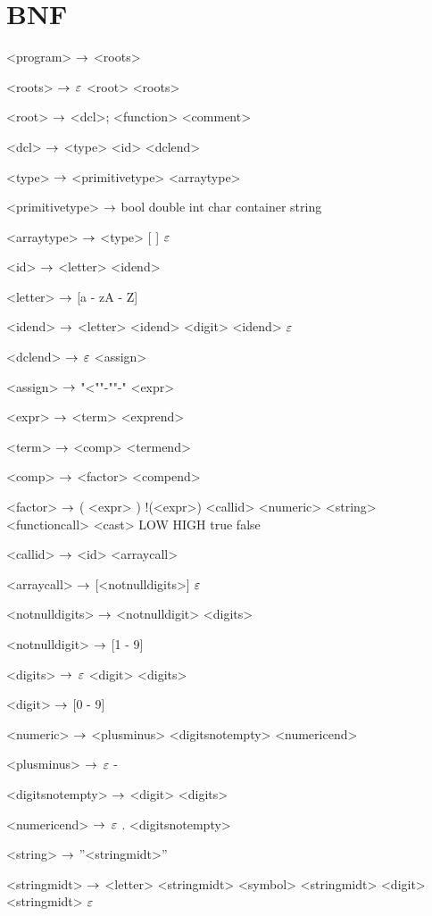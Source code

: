 \section{BNF}
\begin{grammar}
<program> $\rightarrow$ <roots>

<roots> $\rightarrow$ $\varepsilon$
\alt <root> <roots>

<root> $\rightarrow$ <dcl>;
\alt <function>
\alt <comment>

<dcl> $\rightarrow$ <type> <id> <dclend>

<type> $\rightarrow$ <primitivetype> <arraytype>

<primitivetype> $\rightarrow$ bool
\alt double
\alt int
\alt char
\alt container
\alt string

<arraytype> $\rightarrow$ <type> [ ]
\alt $\varepsilon$

<id> $\rightarrow$ <letter> <idend>

<letter> $\rightarrow$ [a - zA - Z]

<idend> $\rightarrow$ <letter> <idend>
	\alt <digit> <idend>
	\alt $\varepsilon$

<dclend> $\rightarrow$ $\varepsilon$
\alt <assign> 

<assign>  $\rightarrow$ "<""-""-" <expr>

<expr> $\rightarrow$ <term> <exprend>

<term> $\rightarrow$ <comp> <termend>

<comp> $\rightarrow$ <factor> <compend>

<factor> $\rightarrow$ ( <expr> )
	\alt !(<expr>)
	\alt <callid>
	\alt <numeric>
	\alt <string>
	\alt <functioncall> 
	\alt <cast>
	\alt LOW
	\alt HIGH
	\alt true
	\alt false

<callid> $\rightarrow$ <id> <arraycall>

<arraycall> $\rightarrow$ [<notnulldigits>]
\alt $\varepsilon$

<notnulldigits> $\rightarrow$ <notnulldigit> <digits>

<notnulldigit> $\rightarrow$ [1 - 9]

<digits> $\rightarrow$ $\varepsilon$
\alt <digit> <digits>

<digit> $\rightarrow$ [0 - 9]

<numeric> $\rightarrow$ <plusminus> <digitsnotempty> <numericend>

<plusminus> $\rightarrow$ $\varepsilon$
	\alt -

<digitsnotempty> $\rightarrow$ <digit> <digits>

<numericend> $\rightarrow$ $\varepsilon$
\alt . <digitsnotempty>

<string> $\rightarrow$ ''<stringmidt>''

<stringmidt> $\rightarrow$ <letter> <stringmidt>
\alt <symbol> <stringmidt>
\alt <digit> <stringmidt>
\alt $\varepsilon$


\end{grammar}
